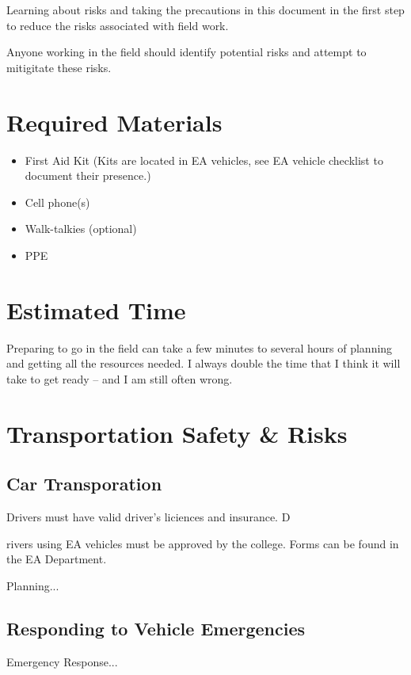 \documentclass[12pt]{../SOP4_alpha}\usepackage[]{graphicx}\usepackage[]{color}
\begin{document}
\NP Learning about risks and taking the precautions in this document in the first step to reduce the risks associated with field work. 

\NP Anyone working in the field should identify potential risks and attempt to mitigitate these risks. 

\section{Required Materials}

\begin{itemize}
  \item First Aid Kit (Kits are located in EA vehicles, see EA vehicle checklist to document their presence.)
  \item Cell phone(s)
  \item Walk-talkies (optional)
  \item PPE
\end{itemize}

\section{Estimated Time}

\NP Preparing to go in the field can take a few minutes to several hours of planning and getting all the resources needed. I always double the time that I think it will take to get ready -- and I am still often wrong. 

\section{Transportation Safety \& Risks}

\subsection{Car Transporation}

\NP Drivers must have valid driver's liciences and insurance. D

\NP rivers using EA vehicles must be approved by the college. Forms can be found in the EA Department. 

\NP Planning...

\subsection{Responding to Vehicle Emergencies}

\NP Emergency Response...
\end{document}
